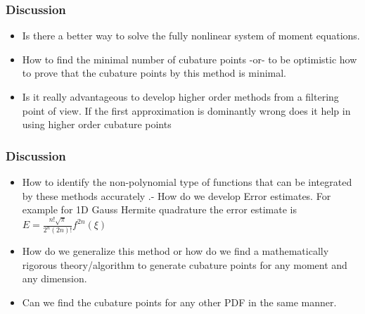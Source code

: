 \documentclass[11pt]{beamer}
\begin{document}
\begin{frame}
\frametitle{Discussion}
\begin{itemize}[<+->]
\item Is there a better way to solve the fully nonlinear system of moment equations. 
\item How to find the minimal number of cubature points -or- to be optimistic how to prove that the cubature points by this method is minimal.
\item Is it really advantageous to develop higher order methods from a filtering point of view. If the first approximation is dominantly wrong does it help in using higher order cubature points

\end{itemize}
\end{frame}
\begin{frame}
\frametitle{Discussion}
\begin{itemize}[<+->]
\item How to identify the non-polynomial type of functions that can be integrated by these methods accurately .- How do we develop Error estimates. For example for 1D Gauss Hermite quadrature the error estimate is $E=\frac{n!\sqrt{\pi}}{2^n(2n)!}f^{2n}(\xi)$ 
\item How do we generalize this method or how do we find a mathematically rigorous theory/algorithm to generate cubature points for any moment and any dimension.
\item Can we find the cubature points for any other PDF in the same manner.
\end{itemize}
\end{frame}
\end{document}
